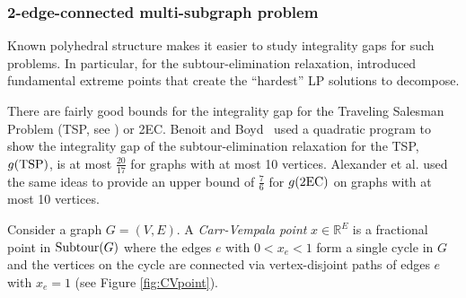 \subsubsection{2-edge-connected multi-subgraph problem}
\label{sec:2EC-intro}
Known polyhedral structure makes it easier to study integrality gaps for such problems. In particular, for the subtour-elimination relaxation, \cite{carrravi,boydcarr,Carr2004} introduced fundamental extreme points that create the ``hardest'' LP solutions to decompose.

There are fairly good bounds for the integrality gap for the Traveling Salesman Problem (TSP, see \cite{tspbook}) or 2EC.
Benoit and Boyd~\cite{TSPcompute} used a quadratic program to show the integrality gap of the subtour-elimination relaxation for the TSP, $g(\operatorname{{{TSP}}})$, is at most $\frac{20}{17}$ for graphs with at most 10 vertices. Alexander et al. \cite{alexander2006integrality} used the same ideas to provide an upper bound of $\frac{7}{6}$ for $g(\2ec)$ on graphs with at most 10 vertices. 

Consider a graph $G=(V,E)$. A \textit{Carr-Vempala point} $x\in \mathbb{R}^E$ is a fractional point in $\operatorname{{Subtour}}(G)$ where the edges $e$ with $0<x_e<1$ form a single cycle in $G$ and the vertices on the cycle are connected via vertex-disjoint paths of edges $e$ with $x_e =1$ (see Figure \ref{fig:CVpoint}).


